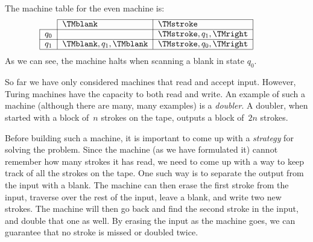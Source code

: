 \documentclass[../../../include/open-logic-section]{subfiles}
\begin{document}
\begin{ex}
The machine table for the even machine is:
\[
\centering
\begin{tabular}{lllll}
\cline{2-3}
\multicolumn{1}{l|}{}      & \multicolumn{1}{l|}{$\TMblank$}                
& \multicolumn{1}{l|}{$\TMstroke$}                &  &  \\ \cline{1-3}
\multicolumn{1}{|l|}{$q_0$} & \multicolumn{1}{l|}{}                          
& \multicolumn{1}{l|}{$\TMstroke, q_1, \TMright$} &  &  \\ \cline{1-3}
\multicolumn{1}{|l|}{$q_1$} & \multicolumn{1}{l|}{$\TMblank, q_1, \TMblank$} 
& \multicolumn{1}{l|}{$\TMstroke, q_0, \TMright$} &  &  \\ \cline{1-3}
\end{tabular}
\]
As we can see, the machine halts when scanning a blank in state $q_0$.
\end{ex}

\begin{explain}
So far we have only considered machines that read and accept input. However, 
Turing machines have the capacity to both read and write. An example of
such a machine (although there are many, many examples) is a \emph{doubler}.
A doubler, when started with a block of~$n$ strokes on the tape, outputs
a block of~$2n$ strokes.

Before building such a machine, it is important to come up with a 
\emph{strategy} for solving the problem. Since the machine (as we have 
formulated it) cannot remember how many strokes it has read, we need to
come up with a way to keep track of all the strokes
on the tape. One such way is to separate the output from the input with a
blank. The machine can then erase the first stroke from the input,
traverse over the rest of the input, leave a blank, and write two new strokes.
The machine will then go back and find the second stroke in the input, and
double that one as well. By erasing the input as the machine goes, we can guarantee
that no stroke is missed or doubled twice.
\end{explain}
\end{document}

